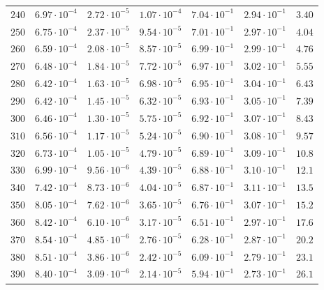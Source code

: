 \begin{table}
\begin{tabular}{ccccccc}
$240 $&$ 6.97\cdot 10^{-4}  $&$ 2.72\cdot 10^{-5}  $&$ 1.07\cdot 10^{-4}  $&$ 7.04\cdot 10^{-1}  $&$ 2.94\cdot 10^{-1}  $&$ 3.40 $\\
$250 $&$ 6.75\cdot 10^{-4}  $&$ 2.37\cdot 10^{-5}  $&$ 9.54\cdot 10^{-5}  $&$ 7.01\cdot 10^{-1}  $&$ 2.97\cdot 10^{-1}  $&$ 4.04 $\\
$260 $&$ 6.59\cdot 10^{-4}  $&$ 2.08\cdot 10^{-5}  $&$ 8.57\cdot 10^{-5}  $&$ 6.99\cdot 10^{-1}  $&$ 2.99\cdot 10^{-1}  $&$ 4.76 $\\
$270 $&$ 6.48\cdot 10^{-4}  $&$ 1.84\cdot 10^{-5}  $&$ 7.72\cdot 10^{-5}  $&$ 6.97\cdot 10^{-1}  $&$ 3.02\cdot 10^{-1}  $&$ 5.55 $\\
$280 $&$ 6.42\cdot 10^{-4}  $&$ 1.63\cdot 10^{-5}  $&$ 6.98\cdot 10^{-5}  $&$ 6.95\cdot 10^{-1}  $&$ 3.04\cdot 10^{-1}  $&$ 6.43 $\\
$290 $&$ 6.42\cdot 10^{-4}  $&$ 1.45\cdot 10^{-5}  $&$ 6.32\cdot 10^{-5}  $&$ 6.93\cdot 10^{-1}  $&$ 3.05\cdot 10^{-1}  $&$ 7.39 $\\
$300 $&$ 6.46\cdot 10^{-4}  $&$ 1.30\cdot 10^{-5}  $&$ 5.75\cdot 10^{-5}  $&$ 6.92\cdot 10^{-1}  $&$ 3.07\cdot 10^{-1}  $&$ 8.43 $\\
$310 $&$ 6.56\cdot 10^{-4}  $&$ 1.17\cdot 10^{-5}  $&$ 5.24\cdot 10^{-5}  $&$ 6.90\cdot 10^{-1}  $&$ 3.08\cdot 10^{-1}  $&$ 9.57 $\\
$320 $&$ 6.73\cdot 10^{-4}  $&$ 1.05\cdot 10^{-5}  $&$ 4.79\cdot 10^{-5}  $&$ 6.89\cdot 10^{-1}  $&$ 3.09\cdot 10^{-1}  $&$ 10.8 $\\
$330 $&$ 6.99\cdot 10^{-4}  $&$ 9.56\cdot 10^{-6}  $&$ 4.39\cdot 10^{-5}  $&$ 6.88\cdot 10^{-1}  $&$ 3.10\cdot 10^{-1}  $&$ 12.1 $\\
$340 $&$ 7.42\cdot 10^{-4}  $&$ 8.73\cdot 10^{-6}  $&$ 4.04\cdot 10^{-5}  $&$ 6.87\cdot 10^{-1}  $&$ 3.11\cdot 10^{-1}  $&$ 13.5 $\\
$350 $&$ 8.05\cdot 10^{-4}  $&$ 7.62\cdot 10^{-6}  $&$ 3.65\cdot 10^{-5}  $&$ 6.76\cdot 10^{-1}  $&$ 3.07\cdot 10^{-1}  $&$ 15.2 $\\
$360 $&$ 8.42\cdot 10^{-4}  $&$ 6.10\cdot 10^{-6}  $&$ 3.17\cdot 10^{-5}  $&$ 6.51\cdot 10^{-1}  $&$ 2.97\cdot 10^{-1}  $&$ 17.6 $\\
$370 $&$ 8.54\cdot 10^{-4}  $&$ 4.85\cdot 10^{-6}  $&$ 2.76\cdot 10^{-5}  $&$ 6.28\cdot 10^{-1}  $&$ 2.87\cdot 10^{-1}  $&$ 20.2 $\\
$380 $&$ 8.51\cdot 10^{-4}  $&$ 3.86\cdot 10^{-6}  $&$ 2.42\cdot 10^{-5}  $&$ 6.09\cdot 10^{-1}  $&$ 2.79\cdot 10^{-1}  $&$ 23.1 $\\
$390 $&$ 8.40\cdot 10^{-4}  $&$ 3.09\cdot 10^{-6}  $&$ 2.14\cdot 10^{-5}  $&$ 5.94\cdot 10^{-1}  $&$ 2.73\cdot 10^{-1}  $&$ 26.1 $\\

\end{tabular}
\end{table}
